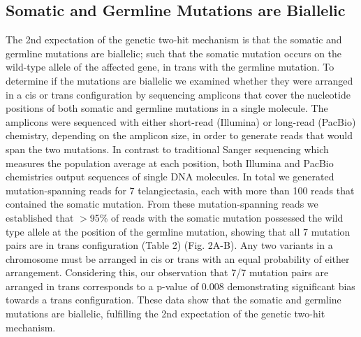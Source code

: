 \subsection{Somatic and Germline Mutations are Biallelic}
The 2nd expectation of the genetic two-hit mechanism is that the somatic and germline mutations are biallelic; such that the somatic mutation occurs on the wild-type allele of the affected gene, in trans with the germline mutation. To determine if the mutations are biallelic we examined whether they were arranged in a cis or trans configuration by sequencing amplicons that cover the nucleotide positions of both somatic and germline mutations in a single molecule. The amplicons were sequenced with either short-read (Illumina) or long-read (PacBio) chemistry, depending on the amplicon size, in order to generate reads that would span the two mutations. In contrast to traditional Sanger sequencing which measures the population average at each position, both Illumina and PacBio chemistries output sequences of single DNA molecules.  In total we generated mutation-spanning reads for 7 telangiectasia, each with more than 100 reads that contained the somatic mutation. From these mutation-spanning reads we established that $>$95\% of reads with the somatic mutation possessed the wild type allele at the position of the germline mutation, showing that all 7 mutation pairs are in trans configuration (Table 2) (Fig. 2A-B). Any two variants in a chromosome must be arranged in cis or trans with an equal probability of either arrangement. Considering this, our observation that 7/7 mutation pairs are arranged in trans corresponds to a p-value of 0.008 demonstrating significant bias towards a trans configuration. These data show that the somatic and germline mutations are biallelic, fulfilling the 2nd expectation of the genetic two-hit mechanism.

